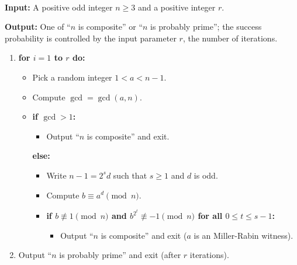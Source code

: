 \begin{algo}~

{\bf Input:} A positive odd integer $n \geq 3$ and a positive integer $r$. 

{\bf Output:} One of ``$n$ is composite'' or ``$n$ is probably prime''; the 
success probability is controlled by the input parameter $r$, the number of 
iterations.
\begin{enumerate}
    \item {\bf for $i = 1$ to $r$ do:}
    \begin{itemize}
        \item Pick a random integer $1 < a < n-1$. 
        \item Compute $\gcd = \gcd(a, n)$. 
        \item {\bf if $\gcd > 1$:}
        \begin{itemize}[$\circ$]
            \item Output ``$n$ is composite'' and exit.
        \end{itemize}
        {\bf else:}
        \begin{itemize}[$\circ$]
            \item Write $n - 1 = 2^s d$ such that $s \geq 1$ and $d$ is odd.
            \item Compute $b \equiv a^d \pmod n$. 
            \item {\bf if $b \not\equiv 1 \pmod n$ and $b^{2^t} \not\equiv -1 
            \pmod n$ for all $0 \leq t \leq s-1$:}
            \begin{itemize}[--]
                \item Output ``$n$ is composite'' and exit ($a$ is an Miller-Rabin witness).
            \end{itemize}
        \end{itemize}
    \end{itemize}
    \item Output ``$n$ is probably prime'' and exit (after $r$ iterations).
\end{enumerate}
\end{algo}
